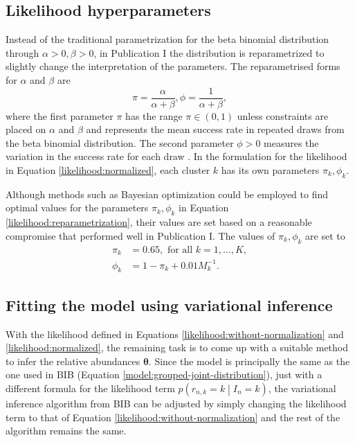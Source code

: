\documentclass[officiallayout]{tktla}
\begin{document}
\subsection{Likelihood hyperparameters}

Instead of the traditional parametrization for the beta binomial
distribution through $\alpha >0, \beta > 0$, in Publication I the
distribution is reparametrized to slightly change the interpretation
of the parameters. The reparametrised forms for $\alpha$ and $\beta$ are
\begin{equation}
  \label{likelihood:reparametrization}
  \pi = \frac{\alpha}{\alpha + \beta}, \phi = \frac{1}{\alpha + \beta},
\end{equation}
where the first parameter $\pi$ has the range $\pi \in \left(0,
1\right)$ unless constraints are placed on $\alpha$ and $\beta$ and
represents the mean success rate in repeated draws from the beta
binomial distribution. The second parameter $\phi > 0$ measures
the variation in the success rate for each draw
\citep{griffiths1973maximum}. In the formulation for the likelihood in
Equation \ref{likelihood:normalized}, each cluster $k$ has its own
parameters $\pi_{k}, \phi_{k}$.

Although methods such as Bayesian optimization \citep{movckus1975bayesian} could
be employed to find optimal values for the parameters $\pi_{k},
\phi_{k}$ in Equation \ref{likelihood:reparametrization},
their values are set based on a reasonable compromise that performed well in
Publication I. The values of $\pi_{k}, \phi_{k}$ are set to
\begin{equation}
  \begin{aligned}
    \pi_k &= 0.65, \text{ for all } k = 1, \dots, K, \\
    \phi_{k} &= 1 - \pi_{k} + 0.01M_{k}^{-1}.
  \end{aligned}
\end{equation}

\subsection{Fitting the model using variational inference}

With the likelihood defined in Equations
\ref{likelihood:without-normalization} and
\ref{likelihood:normalized}, the remaining task is to come up with a
suitable method to infer the relative abundances
$\boldsymbol\theta$. Since the model is principally the same as the
one used in BIB (Equation \ref{model:grouped-joint-distribution}),
just with a different formula for the likelihood term $p\left(r_{n, k}
= k \middle| I_{n} = k\right)$, the variational inference algorithm
from BIB can be adjusted by simply changing the likelihood term to
that of Equation \ref{likelihood:without-normalization} and the rest of
the algorithm remains the same.
\end{document}
